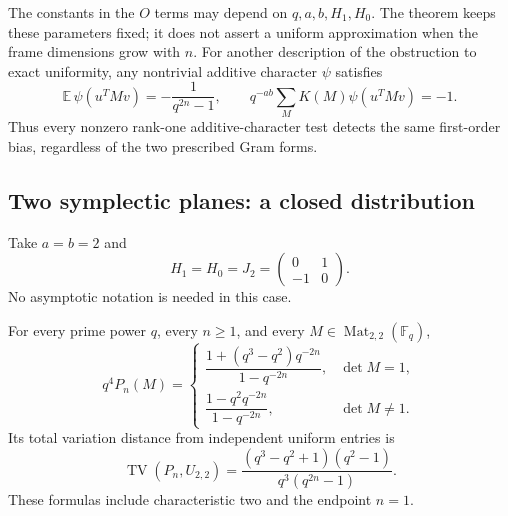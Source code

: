 The constants in the $O$ terms may depend on $q,a,b,H_1,H_0$.
The theorem keeps these parameters fixed; it does not assert a uniform
approximation when the frame dimensions grow with $n$.
For another description of the obstruction to exact uniformity, any
nontrivial additive character $\psi$ satisfies
\[
 \mathbb E\,\psi(u^TMv)=-\frac{1}{q^{2n}-1},\qquad
 q^{-ab}\sum_M K(M)\psi(u^TMv)=-1.
\]
Thus every nonzero rank-one additive-character test detects the same
first-order bias, regardless of the two prescribed Gram forms.

\subsection{Two symplectic planes: a closed distribution}
\label{sec:two-planes}

Take $a=b=2$ and
\[
 H_1=H_0=J_2=\begin{pmatrix}0&1\\-1&0\end{pmatrix}.
\]
No asymptotic notation is needed in this case.

\begin{theorem}
\label{thm:two-plane-law}
For every prime power $q$, every $n\geq1$, and every
$M\in\operatorname{Mat}_{2,2}(\mathbb F_q)$,
\begin{equation}
 q^4P_n(M)=
 \begin{cases}
 \dfrac{1+(q^3-q^2)q^{-2n}}{1-q^{-2n}},&\det M=1,\\[7pt]
 \dfrac{1-q^2q^{-2n}}{1-q^{-2n}},&\det M\ne1.
 \end{cases}
 \label{eq:two-plane-likelihood}
\end{equation}
Its total variation distance from independent uniform entries is
\begin{equation}
 \operatorname{TV}(P_n,U_{2,2})
 =\frac{(q^3-q^2+1)(q^2-1)}{q^3(q^{2n}-1)}.
 \label{eq:two-plane-TV}
\end{equation}
These formulas include characteristic two and the endpoint $n=1$.
\end{theorem}


